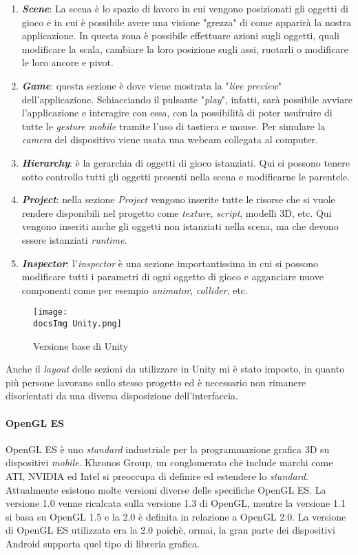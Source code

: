 \begin{enumerate}
	\item \textbf{\textit{Scene}}: La scena \`e lo spazio di lavoro in cui vengono posizionati gli oggetti di gioco e in cui \`e possibile avere una visione "grezza" di come apparir\`a la nostra applicazione. In questa zona \`e possibile effettuare azioni sugli oggetti, quali modificare la scala, cambiare la loro posizione sugli assi, ruotarli o modificare le loro ancore e pivot.
	\item \textbf{\textit{Game}}: questa sezione \`e dove viene mostrata la "\textit{live preview}" dell'applicazione. Schiacciando il pulsante "\textit{play}", infatti, sar\`a possibile avviare l'applicazione e interagire con essa, con la possibilit\`a di poter usufruire di tutte le \textit{gesture mobile} tramite l'uso di tastiera e mouse. Per simulare la \textit{camera} del dispositivo viene usata una webcam collegata al computer.
	\item \textbf{\textit{Hierarchy}}: \`e la gerarchia di oggetti di gioco istanziati. Qui si possono tenere sotto controllo tutti gli oggetti presenti nella scena e modificarne le parentele.
	\item \textbf{\textit{Project}}: nella sezione \textit{Project} vengono inserite tutte le risorse che si vuole rendere disponibili nel progetto come \textit{texture\gloss}, \textit{script}, modelli 3D, etc. Qui vengono inseriti anche gli oggetti non istanziati nella scena, ma che devono essere istanziati \textit{runtime}.
	\item \textbf{\textit{Inspector}}: l'\textit{inspector} \`e una sezione importantissima in cui si possono modificare tutti i parametri di ogni oggetto di gioco e agganciare nuove componenti come per esempio \textit{animator}, \textit{collider\gloss}, etc.
\end{enumerate}

\begin{figure}[H]
	\centering
	\texttt{[image: \\docsImg Unity.png]}
	\caption{Versione base di Unity}
	\label{fig:Versione base di Unity}
\end{figure}
\noindent
Anche il \textit{layout} delle sezioni da utilizzare in Unity mi \`e stato imposto, in quanto pi\`u persone lavorano sullo stesso progetto ed \`e necessario non rimanere disorientati da una diversa disposizione dell'interfaccia.

\paragraph{OpenGL ES}
OpenGL ES è uno \textit{standard} industriale per la programmazione grafica 3D su dispositivi \textit{mobile}. Khronos Group, un conglomerato che include marchi come ATI, NVIDIA ed Intel si preoccupa di definire ed estendere lo \textit{standard}.
Attualmente esistono molte versioni diverse delle specifiche OpenGL ES. La versione 1.0 venne ricalcata sulla versione 1.3 di OpenGL, mentre la versione 1.1 si basa su OpenGL 1.5 e la 2.0 è definita in relazione a OpenGL 2.0. La versione di OpenGL ES utilizzata era la 2.0 poich\`e, ormai, la gran parte dei dispositivi Android supporta quel tipo di libreria grafica.

